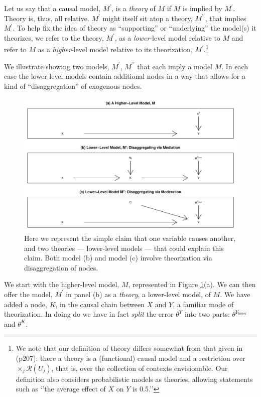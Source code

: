 \documentclass[
  12pt,
]{book}
\begin{document}
Let us say that a causal model, \(M^\prime\), is a \emph{theory} of \(M\) if \(M\) is implied by \(M^\prime\). Theory is, thus, all relative. \(M^\prime\) might itself sit atop a theory, \(M^{\prime\prime}\), that implies \(M^\prime\). To help fix the idea of theory as ``supporting'' or ``underlying'' the model(s) it theorizes, we refer to the theory, \(M^\prime\), as a \emph{lower}-level model relative to \(M\) and refer to \(M\) as a \emph{higher}-level model relative to its theorization, \(M^\prime\).\footnote{We note that our definition of theory differs somewhat from that given in \citet{pearl2009causality} (p207): there a theory is a (functional) causal model and a restriction over \(\times_j \mathcal{R}(U_j)\), that is, over the collection of contexts envisionable. Our definition also considers probabilistic models as theories, allowing statements such as `'the average effect of \(X\) on \(Y\) is 0.5.''}

We illustrate showing two models, \(M^\prime\), \(M^{\prime\prime}\) that each imply a model \(M\). In each case the lower level models contain additional nodes in a way that allows for a kind of ``disaggregation'' of exogenous nodes.

\begin{figure}

{\centering \includegraphics[width=.5\textwidth]{ii_files/figure-latex/Highlow-1} 

}

\caption{Here we represent the simple claim that one variable causes another, and two theories --- lower-level models --- that could explain this claim. Both model (b) and model (c) involve theorization via disaggregation of nodes.}\label{fig:Highlow}
\end{figure}

We start with the higher-level model, \(M\), represented in Figure \ref{fig:Highlow}(a). We can then offer the model, \(M^\prime\) in panel (b) as a \emph{theory}, a lower-level model, of \(M\). We have added a node, \(K\), in the causal chain between \(X\) and \(Y\), a familiar mode of theorization. In doing do we have in fact \emph{split} the error \(\theta^Y\) into two parts: \(\theta^{Y_\text{lower}}\) and \(\theta^K\).
\end{document}
